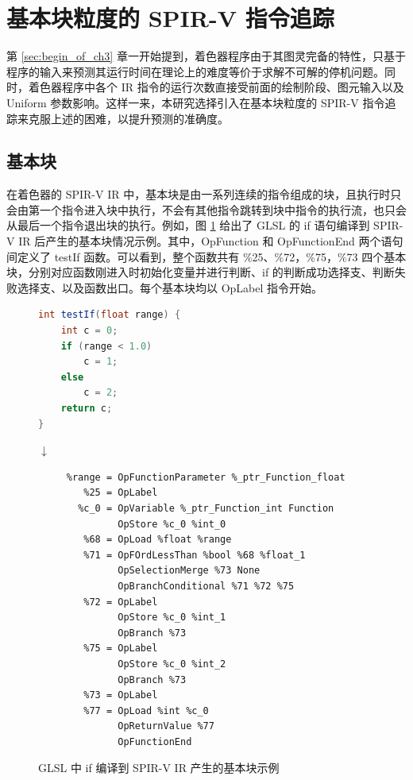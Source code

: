 \section{基本块粒度的 SPIR-V 指令追踪}
\label{sec:tracing}

第 \ref{sec:begin_of_ch3} 章一开始提到，着色器程序由于其图灵完备的特性，只基于程序的输入来预测其运行时间在理论上的难度等价于求解不可解的停机问题\cite{10.1112/plms/s2-42.1.230}。同时，着色器程序中各个 IR 指令的运行次数直接受前面的绘制阶段、图元输入以及 Uniform 参数影响。这样一来，本研究选择引入在基本块粒度的 SPIR-V 指令追踪来克服上述的困难，以提升预测的准确度。


\subsection{基本块}

\label{sec:spv_bb}

在着色器的 SPIR-V IR 中，基本块是由一系列连续的指令组成的块，且执行时只会由第一个指令进入块中执行，不会有其他指令跳转到块中指令的执行流，也只会从最后一个指令退出块的执行。例如，图 \ref{fig:if_spv_ir} 给出了 GLSL 的 if 语句编译到 SPIR-V IR 后产生的基本块情况示例。其中，OpFunction 和 OpFunctionEnd 两个语句间定义了 testIf 函数。可以看到，整个函数共有 \%25、\%72，\%75，\%73 四个基本块，分别对应函数刚进入时初始化变量并进行判断、if 的判断成功选择支、判断失败选择支、以及函数出口。每个基本块均以 OpLabel 指令开始。

\begin{figure}
\centering
\begin{lstlisting}[language=GLSL]
int testIf(float range) {
    int c = 0;
    if (range < 1.0)
        c = 1;
    else
        c = 2;
    return c;
}
\end{lstlisting}
$ \downarrow $
\begin{lstlisting}[language=spirvir]
%testIf_f1_ = OpFunction %int None %22
     %range = OpFunctionParameter %_ptr_Function_float
        %25 = OpLabel
       %c_0 = OpVariable %_ptr_Function_int Function
              OpStore %c_0 %int_0
        %68 = OpLoad %float %range                       
        %71 = OpFOrdLessThan %bool %68 %float_1
              OpSelectionMerge %73 None                  
              OpBranchConditional %71 %72 %75
        %72 = OpLabel
              OpStore %c_0 %int_1
              OpBranch %73
        %75 = OpLabel
              OpStore %c_0 %int_2
              OpBranch %73
        %73 = OpLabel
        %77 = OpLoad %int %c_0
              OpReturnValue %77
              OpFunctionEnd
\end{lstlisting}
\caption{GLSL 中 if 编译到 SPIR-V IR 产生的基本块示例}
\label{fig:if_spv_ir}
\end{figure}

